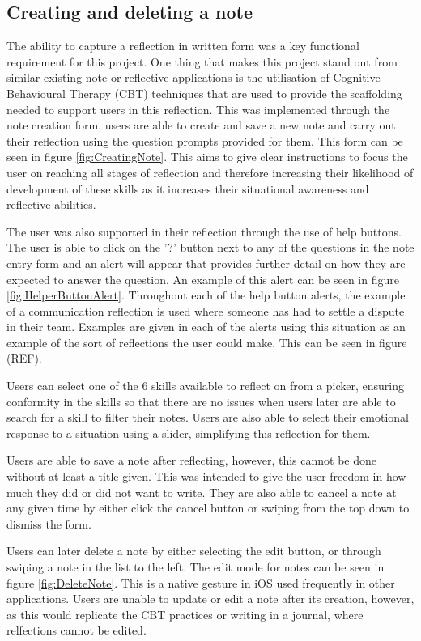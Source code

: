 \documentclass{l4proj}
\begin{document}
\subsection{Creating and deleting a note}

The ability to capture a reflection in written form was a key functional requirement for this project. One thing that makes this project
stand out from similar existing note or reflective applications is the utilisation of Cognitive Behavioural Therapy (CBT) 
techniques that are used to provide the scaffolding needed to support users in this reflection. This was implemented through the note creation form,
users are able to create and save a new note and carry out their reflection using the question prompts provided for them. This form can be seen in figure \ref{fig:CreatingNote}. This aims to give clear instructions to
focus the user on reaching all stages of reflection and therefore increasing their likelihood of development of these skills as it increases their situational
awareness and reflective abilities. 

The user was also supported in their reflection through the use of help buttons. The user is able to click on the '?' 
button next to any of the questions in the note entry form and an alert will appear that provides further detail on how they are expected to answer the 
question. An example of this alert can be seen in figure \ref{fig:HelperButtonAlert}. Throughout each of the help button alerts, the example of a communication reflection is used where someone has had to settle a dispute in their 
team. Examples are given in each of the alerts using this situation as an example of the sort of reflections the user could make. This can be seen in figure
(REF). 

Users can select one of the 6 skills available to reflect on from a picker, ensuring conformity in the skills so that there are no issues when users later are
able to search for a skill to filter their notes. Users are also able to select their emotional response to a situation using a slider, simplifying this
reflection for them. 

Users are able to save a note after reflecting, however, this cannot be done without at least a title given. This was intended to give the user freedom
in how much they did or did not want to write. They are also able to cancel a note at any given time by either click the cancel button or swiping
from the top down to dismiss the form. 

Users can later delete a note by either selecting the edit button, or through swiping a note in the list to the left. The edit mode for notes can be seen in figure \ref{fig:DeleteNote}. This is a native gesture in iOS used
frequently in other applications. Users are unable to update or edit a note after its creation, however, as this would replicate the CBT practices or writing in a journal, where relfections cannot be edited. 
\end{document}
